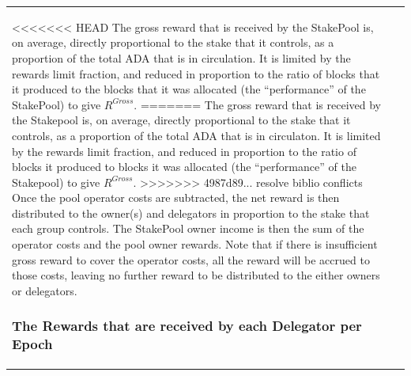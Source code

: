 \documentclass[11pt,a4paper,dvipsnames,twosided,final]{article}
\newcommand{\khcomment}[1]{\todo[color=blue!20]{KH: #1}}
\newcommand{\ada}{ADA{}}
\begin{document}
\begin{tabular}{||l|l||}
\noindent
<<<<<<< HEAD
The gross reward that is received by the StakePool is, on average, directly proportional to the
stake that it controls, as a proportion of the total \ada{} that is in circulation.
It is limited by the rewards limit fraction, and reduced in proportion to the ratio of blocks that it produced
to the blocks that it was allocated (the ``performance'' of the StakePool) to give $R^{\textit{Gross}}$.
=======
The gross reward that is received by the Stakepool is, on average, directly proportional to the
stake that it controls, as a proportion of the total \ada{} that is in circulaton.
It is limited by the rewards limit fraction, and reduced in proportion to the ratio of blocks it produced
to blocks it was allocated (the ``performance'' of the Stakepool) to give $R^{\textit{Gross}}$.
\khcomment{Check this - not overall performance.}
>>>>>>> 4987d89... resolve biblio conflicts
Once the pool operator costs are subtracted,
the net reward is then distributed to the owner(s) and delegators in proportion to the
stake that each group controls.  The StakePool owner income is then the sum of the operator costs and the pool owner rewards.
Note that if there is insufficient gross reward to cover the operator costs, all the reward will be accrued to those
costs, leaving no further reward to be distributed to the either owners or delegators.


\subsubsection*{The Rewards that are received by each Delegator per Epoch}


\end{tabular}
\end{document}
